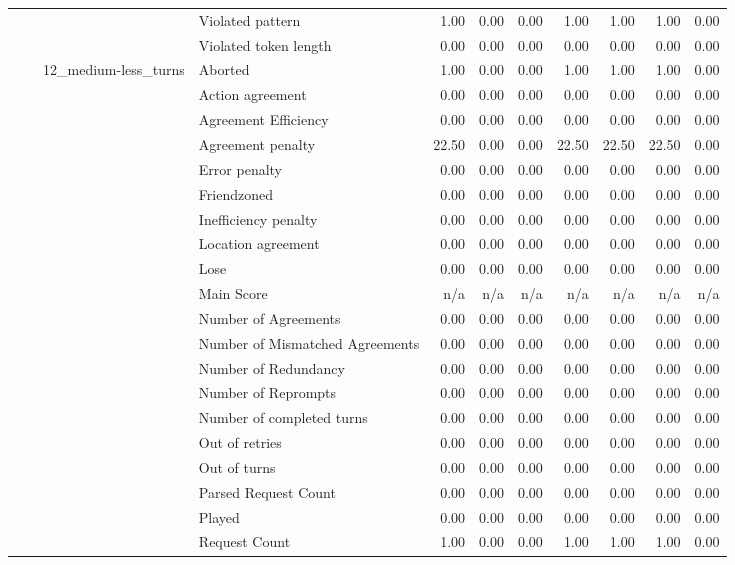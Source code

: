 \begin{tabular}{llllrrrrrrr}
 &  &  & Violated pattern & 1.00 & 0.00 & 0.00 & 1.00 & 1.00 & 1.00 & 0.00 \\
 &  &  & Violated token length & 0.00 & 0.00 & 0.00 & 0.00 & 0.00 & 0.00 & 0.00 \\
\cline{3-11}
 &  & \multirow[t]{27}{*}{12_medium-less_turns} & Aborted & 1.00 & 0.00 & 0.00 & 1.00 & 1.00 & 1.00 & 0.00 \\
 &  &  & Action agreement & 0.00 & 0.00 & 0.00 & 0.00 & 0.00 & 0.00 & 0.00 \\
 &  &  & Agreement Efficiency & 0.00 & 0.00 & 0.00 & 0.00 & 0.00 & 0.00 & 0.00 \\
 &  &  & Agreement penalty & 22.50 & 0.00 & 0.00 & 22.50 & 22.50 & 22.50 & 0.00 \\
 &  &  & Error penalty & 0.00 & 0.00 & 0.00 & 0.00 & 0.00 & 0.00 & 0.00 \\
 &  &  & Friendzoned & 0.00 & 0.00 & 0.00 & 0.00 & 0.00 & 0.00 & 0.00 \\
 &  &  & Inefficiency penalty & 0.00 & 0.00 & 0.00 & 0.00 & 0.00 & 0.00 & 0.00 \\
 &  &  & Location agreement & 0.00 & 0.00 & 0.00 & 0.00 & 0.00 & 0.00 & 0.00 \\
 &  &  & Lose & 0.00 & 0.00 & 0.00 & 0.00 & 0.00 & 0.00 & 0.00 \\
 &  &  & Main Score & n/a & n/a & n/a & n/a & n/a & n/a & n/a \\
 &  &  & Number of Agreements & 0.00 & 0.00 & 0.00 & 0.00 & 0.00 & 0.00 & 0.00 \\
 &  &  & Number of Mismatched Agreements & 0.00 & 0.00 & 0.00 & 0.00 & 0.00 & 0.00 & 0.00 \\
 &  &  & Number of Redundancy & 0.00 & 0.00 & 0.00 & 0.00 & 0.00 & 0.00 & 0.00 \\
 &  &  & Number of Reprompts & 0.00 & 0.00 & 0.00 & 0.00 & 0.00 & 0.00 & 0.00 \\
 &  &  & Number of completed turns & 0.00 & 0.00 & 0.00 & 0.00 & 0.00 & 0.00 & 0.00 \\
 &  &  & Out of retries & 0.00 & 0.00 & 0.00 & 0.00 & 0.00 & 0.00 & 0.00 \\
 &  &  & Out of turns & 0.00 & 0.00 & 0.00 & 0.00 & 0.00 & 0.00 & 0.00 \\
 &  &  & Parsed Request Count & 0.00 & 0.00 & 0.00 & 0.00 & 0.00 & 0.00 & 0.00 \\
 &  &  & Played & 0.00 & 0.00 & 0.00 & 0.00 & 0.00 & 0.00 & 0.00 \\
 &  &  & Request Count & 1.00 & 0.00 & 0.00 & 1.00 & 1.00 & 1.00 & 0.00 \\

\end{tabular}
